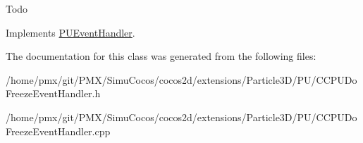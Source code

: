 Todo 

Implements \hyperlink{classPUEventHandler_a760172609708c65548dcac364c9b3b9c}{P\+U\+Event\+Handler}.



The documentation for this class was generated from the following files\+:\begin{DoxyCompactItemize}
\item 
/home/pmx/git/\+P\+M\+X/\+Simu\+Cocos/cocos2d/extensions/\+Particle3\+D/\+P\+U/C\+C\+P\+U\+Do\+Freeze\+Event\+Handler.\+h\item 
/home/pmx/git/\+P\+M\+X/\+Simu\+Cocos/cocos2d/extensions/\+Particle3\+D/\+P\+U/C\+C\+P\+U\+Do\+Freeze\+Event\+Handler.\+cpp\end{DoxyCompactItemize}
